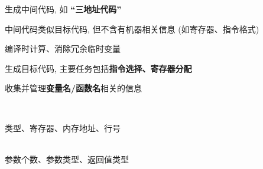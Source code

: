 \begin{frame}{}
  \begin{center}
     生成中间代码, 如 {\bf ``三地址代码''}

    \vspace{0.80cm}

    \vspace{0.30cm}
    中间代码类似目标代码, 但不含有机器相关信息 (如寄存器、指令格式)
  \end{center}
\end{frame}

\begin{frame}{}
  \begin{center}

    \vspace{0.80cm}

    \vspace{0.30cm}
    编译时计算、消除冗余临时变量
  \end{center}
\end{frame}

\begin{frame}{}
  \begin{center}
     生成目标代码, 主要任务包括{\bf 指令选择、寄存器分配}

    \vspace{0.80cm}
  \end{center}
\end{frame}

\begin{frame}{}
  \begin{center}
     收集并管理{\bf 变量名/函数名}相关的信息
  \end{center}

  \begin{columns}
      \begin{center}
         \\[3pt]
        类型、寄存器、内存地址、行号

        \vspace{0.50cm}
         \\[3pt]
        参数个数、参数类型、返回值类型
      \end{center}
  \end{columns}
\end{frame}

